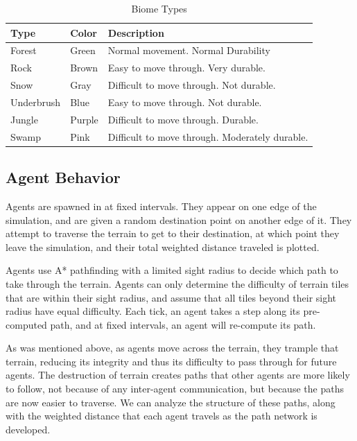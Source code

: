 \documentclass[conference]{IEEEtran}
\begin{document}
\begin{table}[h]
  \begin{center}
    \begin{tabular}{| l | l | l |}
    \hline
    Type & Color & Description \\ \hline \hline
    Forest & Green & Normal movement. Normal Durability \\ \hline
	Rock & Brown & Easy to move through. Very durable. \\ \hline
	Snow & Gray & Difficult to move through. Not durable. \\ \hline
	Underbrush & Blue & Easy to move through. Not durable.\\ \hline
	Jungle & Purple & Difficult to move through. Durable. \\ \hline
	Swamp & Pink & Difficult to move through. Moderately durable. \\ \hline
    \end{tabular}
  \end{center}
\caption{Biome Types}
\end{table}

\subsection{Agent Behavior}
Agents are spawned in at fixed intervals. They appear on one edge of the simulation, and are given a random destination point on another edge of it. They attempt to traverse the terrain to get to their destination, at which point they leave the simulation, and their total weighted distance traveled is plotted.

Agents use A* pathfinding with a limited sight radius to decide which path to take through the terrain. Agents can only determine the difficulty of terrain tiles that are within their sight radius, and assume that all tiles beyond their sight radius have equal difficulty. Each tick, an agent takes a step along its pre-computed path, and at fixed intervals, an agent will re-compute its path.
 
As was mentioned above, as agents move across the terrain, they trample that terrain, reducing its integrity and thus its difficulty to pass through for future agents. The destruction of terrain creates paths that other agents are more likely to follow, not because of any inter-agent communication, but because the paths are now easier to traverse. We can analyze the structure of these paths, along with the weighted distance that each agent travels as the path network is developed.
\end{document}
